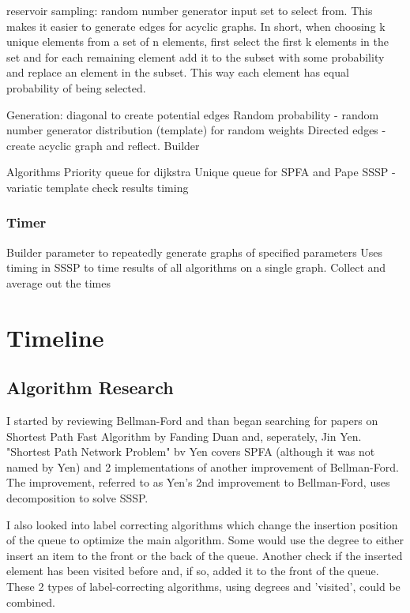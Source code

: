 \documentclass{article}
\begin{document}
reservoir sampling:
	random number generator
	input set to select from. This makes it easier to generate edges for acyclic graphs.
In short, when choosing k unique elements from a set of n elements, first select the first k elements in the set and for each remaining element add it to the subset with some probability and replace an element in the subset. This way each element has equal probability of being selected. 

Generation:
	diagonal to create potential edges
	Random probability - random number generator distribution (template) for random weights
	Directed edges - create acyclic graph and reflect.
	Builder
	
Algorithms
	Priority queue for dijkstra
	Unique queue for SPFA and Pape
	SSSP - variatic template
	check results
	timing
	
\subsubsection{Timer}
	Builder parameter to repeatedly generate graphs of specified parameters
	Uses timing in SSSP to time results of all algorithms on a single graph. Collect and average out the times
	

\section{Timeline}

\subsection{Algorithm Research}
I started by reviewing Bellman-Ford and than began searching for papers on Shortest Path Fast Algorithm by Fanding Duan and, seperately, Jin Yen. "Shortest Path Network Problem" bv Yen covers SPFA (although it was not named by Yen) and 2 implementations of another improvement of Bellman-Ford. The improvement, referred to as Yen's 2nd improvement to Bellman-Ford, uses decomposition to solve SSSP. 

I also looked into label correcting algorithms which change the insertion position of the queue to optimize the main algorithm. Some would use the degree to either insert an item to the front or the back of the queue. Another check if the inserted element has been visited before and, if so, added it to the front of the queue. These 2 types of label-correcting algorithms, using degrees and 'visited', could be combined.
\end{document}

